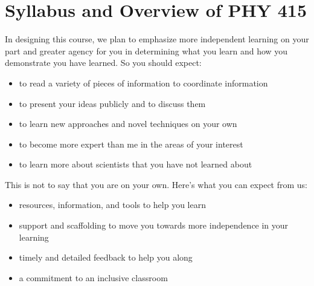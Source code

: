 \documentclass[letterpaper,10pt,english]{jupyterBook}
\begin{document}
\chapter{Syllabus and Overview of PHY 415}
\label{\detokenize{content/0_course/0_syllabus:syllabus-and-overview-of-phy-415}}\label{\detokenize{content/0_course/0_syllabus::doc}}
\sphinxAtStartPar
In designing this course, we plan to emphasize more independent learning on your part and greater agency for you in determining what you learn and how you demonstrate you have learned. So you should expect:
\begin{itemize}
\item {} 
\sphinxAtStartPar
to read a variety of pieces of information to coordinate information

\item {} 
\sphinxAtStartPar
to present your ideas publicly and to discuss them

\item {} 
\sphinxAtStartPar
to learn new approaches and novel techniques on your own

\item {} 
\sphinxAtStartPar
to become more expert than me in the areas of your interest

\item {} 
\sphinxAtStartPar
to learn more about scientists that you have not learned about

\end{itemize}

\sphinxAtStartPar
This is not to say that you are on your own. Here’s what you can expect from us:
\begin{itemize}
\item {} 
\sphinxAtStartPar
resources, information, and tools to help you learn

\item {} 
\sphinxAtStartPar
support and scaffolding to move you towards more independence in your learning

\item {} 
\sphinxAtStartPar
timely and detailed feedback to help you along

\item {} 
\sphinxAtStartPar
a commitment to an inclusive classroom

\end{itemize}

\sphinxAtStartPar
{}
\end{document}
